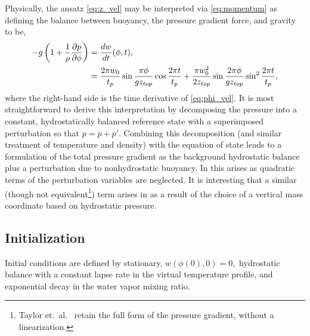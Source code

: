 Physically, the ansatz \eqref{eq:z_vel} may be interpreted via \eqref{eq:momentum} as defining the balance between buoyancy, the pressure gradient force, and gravity to be,
\begin{align}
  -g\left(1 +  \frac{1}{\rho}\frac{\partial p }{\partial \phi}\right) &= \frac{ d w}{d t}(\phi,t), \notag \\
  &= \frac{2\pi w_0}{t_p}\sin\frac{\pi\phi}{gz_{top}}\cos\frac{2\pi t}{t_p} + \frac{\pi w_0^2}{2z_{top}}\sin\frac{2\pi\phi}{gz_{top}}\sin^2\frac{2\pi t}{t_p},
\end{align}
where the right-hand side is the time derivative of \eqref{eq:phi_vel}.
It is most straightforward to derive this interpretation by decomposing the pressure into a constant, hydrostatically balanced reference state with a superimposed perturbation \cite{Klemp1978,Srivastava1967,SoongOgura1973} so that $p = \overline{p} + p'$.
Combining this decomposition (and similar treatment of temperature and density) with the equation of state leads to a formulation of the total pressure gradient as the background hydrostatic balance plus a perturbation due to nonhydrostatic buoyancy.  
In \cite{Klemp1978,Srivastava1967,SoongOgura1973} this arises as quadratic terms of the perturbation variables are neglected.  
It is interesting that a similar (though not equivalent\footnote{Taylor et.~al.~\cite{Taylor2020} retain the full form of the pressure gradient, without a linearization.}) term arises in \cite{Taylor2020} as a result of the choice of a vertical mass coordinate based on hydrostatic pressure.
  
\subsection{Initialization}

Initial conditions are defined by stationary, $w(\phi(0),0) = 0,$ hydrostatic balance with a constant lapse rate in the virtual temperature profile, and exponential decay in the water vapor mixing ratio.

